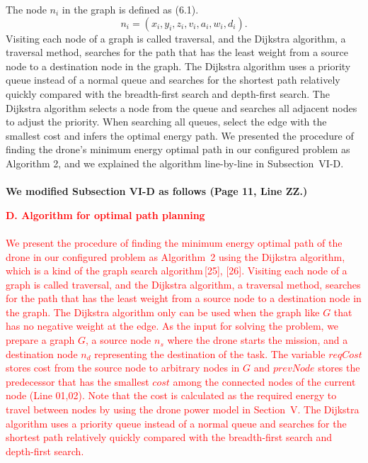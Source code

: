 \documentclass[onecolumn]{IEEEconf}
\begin{document}
\begin{description}
{    The node $n_i$ in the graph is defined as (6.1).
    \begin{equation*}
    n_i = (x_i, y_i, z_i, v_i, a_i, w_i, d_i). \tag{6.1} \label{eq:node}
    \end{equation*}
    Visiting each node of a graph is called traversal, and the Dijkstra algorithm, a traversal method, searches for the path that has the least weight from a source node to a destination node in the graph. The Dijkstra algorithm uses a priority queue instead of a normal queue and searches for the shortest path relatively quickly compared with the breadth-first search and depth-first search. The Dijkstra algorithm selects a node from the queue and searches all adjacent nodes to adjust the priority. When searching all queues, select the edge with the smallest cost and infers the optimal energy path.
    We presented the procedure of finding the drone's minimum energy optimal path in our configured problem as Algorithm 2, and we explained the algorithm line-by-line in Subsection~VI-D.
	}
	~\\
    ~\\
	\textbf{We modified Subsection VI-D as follows (Page 11, Line ZZ.)}
    \begin{mdframed} [linewidth=.75pt, userdefinedwidth=0.9\textwidth]
    \textbf{\textcolor{red}{D. Algorithm for optimal path planning}}~\\
    ~\\
    \textcolor{red}{
    We present the procedure of finding the minimum energy optimal path of the drone in our configured problem as Algorithm~2 using the Dijkstra algorithm, which is a kind of the graph search algorithm\,[25], [26].
    Visiting each node of a graph is called traversal, and the Dijkstra algorithm, a traversal method, searches for the path that has the least weight from a source node to a destination node in the graph. The Dijkstra algorithm only can be used when the graph like $G$ that has no negative weight at the edge.
    As the input for solving the problem, we prepare a graph $G$, a source node $n_s$ where the drone starts the mission, and a destination node $n_d$ representing the destination of the task.
    The variable $reqCost$ stores cost from the source node to arbitrary nodes in $G$ and $prevNode$ stores the predecessor that has the smallest $cost$ among the connected nodes of the current node (Line 01,02). 
    Note that the cost is calculated as the required energy to travel between nodes by using the drone power model in Section~V.
    The Dijkstra algorithm uses a priority queue instead of a normal queue and searches for the shortest path relatively quickly compared with the breadth-first search and depth-first search.
}
\end{mdframed}
\end{description}
\end{document}
